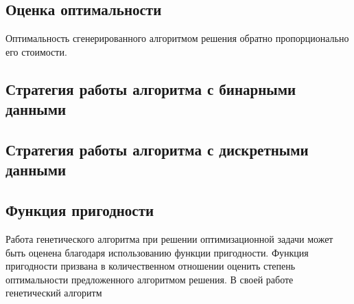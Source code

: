 \subsection*{Оценка оптимальности}
Оптимальность сгенерированного алгоритмом решения обратно пропорционально его стоимости.

\subsection*{Стратегия работы алгоритма с бинарными данными}

\subsection*{Стратегия работы алгоритма с дискретными данными}

\subsection*{Функция пригодности}
Работа генетического алгоритма при решении оптимизационной задачи может быть оценена благодаря использованию функции пригодности. Функция пригодности призвана в количественном отношении оценить степень оптимальности предложенного алгоритмом решения. В своей работе генетический алгоритм 

